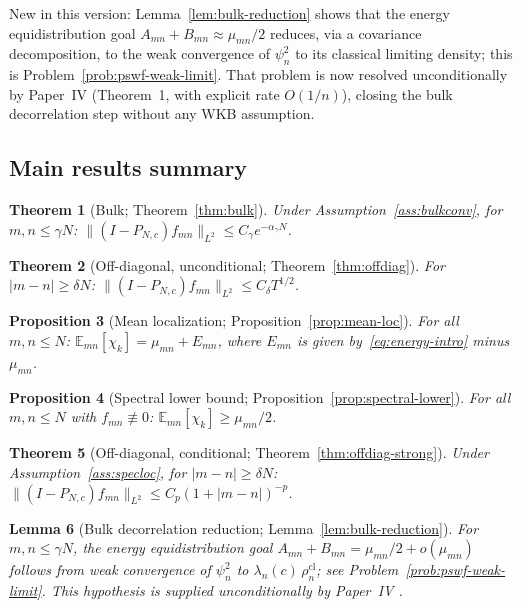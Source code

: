 \documentclass[12pt,a4paper]{amsart}
\newtheorem{theorem}{Theorem}[section]
\newtheorem{lemma}[theorem]{Lemma}
\newtheorem{proposition}[theorem]{Proposition}
\theoremstyle{definition}
\newcommand{\PN}{P_{N,c}}
\newcommand{\mumN}{\mu_{mn}}
\newcommand{\Emn}{\mathbb{E}_{mn}}
\newcommand{\rhocl}{\rho_n^{\mathrm{cl}}}
\begin{document}
New in this version: Lemma~\ref{lem:bulk-reduction} shows that
the energy equidistribution goal $A_{mn}+B_{mn}\approx\mumN/2$
reduces, via a covariance decomposition, to the weak convergence
of $\psi_n^2$ to its classical limiting density; this is
Problem~\ref{prob:pswf-weak-limit}.
That problem is now resolved unconditionally by Paper~IV
\cite{PaperIV} (Theorem~1, with explicit rate $O(1/n)$),
closing the bulk decorrelation step without any WKB assumption.

\subsection{Main results summary}

\begin{theorem}[Bulk; Theorem~\ref{thm:bulk}]
Under Assumption~\ref{ass:bulkconv}, for $m,n \le \gamma N$:
$\|(I-\PN)f_{mn}\|_{L^2} \le C_\gamma e^{-\alpha_\gamma N}$.
\end{theorem}

\begin{theorem}[Off-diagonal, unconditional; Theorem~\ref{thm:offdiag}]
For $|m-n| \ge \delta N$:
$\|(I-\PN)f_{mn}\|_{L^2} \le C_\delta T^{1/2}$.
\end{theorem}

\begin{proposition}[Mean localization; Proposition~\ref{prop:mean-loc}]
For all $m,n \le N$:
$\Emn[\chi_k] = \mumN + E_{mn}$,
where $E_{mn}$ is given by~\eqref{eq:energy-intro} minus $\mumN$.
\end{proposition}

\begin{proposition}[Spectral lower bound; Proposition~\ref{prop:spectral-lower}]
For all $m,n \le N$ with $f_{mn} \not\equiv 0$:
$\Emn[\chi_k] \ge \mumN/2$.
\end{proposition}

\begin{theorem}[Off-diagonal, conditional; Theorem~\ref{thm:offdiag-strong}]
Under Assumption~\ref{ass:specloc}, for $|m-n| \ge \delta N$:
$\|(I-\PN)f_{mn}\|_{L^2} \le C_p(1+|m-n|)^{-p}$.
\end{theorem}

\begin{lemma}[Bulk decorrelation reduction; Lemma~\ref{lem:bulk-reduction}]
For $m,n \le \gamma N$, the energy equidistribution goal
$A_{mn}+B_{mn} = \mumN/2 + o(\mumN)$
follows from weak convergence of $\psi_n^2$ to
$\lambda_n(c)\,\rhocl$; see Problem~\ref{prob:pswf-weak-limit}.
This hypothesis is supplied unconditionally by Paper~IV \cite{PaperIV}.
\end{lemma}
\end{document}
